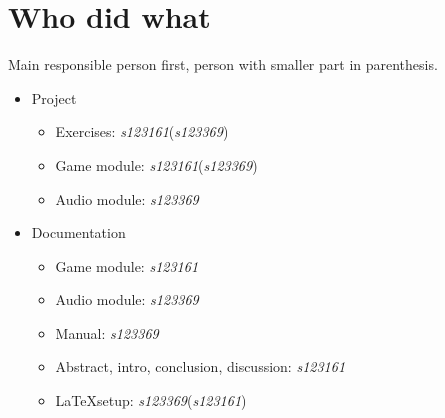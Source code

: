 \section{Who did what}
Main responsible person first, person with smaller part in parenthesis.

\newcommand{\cars}{\emph{s123161}}
\newcommand{\sor}{\emph{s123369}}
\begin{itemize}
  \item Project
  \begin{itemize}
    \item Exercises:  \cars  (\sor)
    \item Game module:  \cars (\sor)
    \item Audio module: \sor
  \end{itemize} 
  \item Documentation
  \begin{itemize}
    \item Game module:  \cars
    \item Audio module:  \sor
    \item Manual:  \sor
    \item Abstract, intro, conclusion, discussion:  \cars
    \item \LaTeX setup:  \sor  (\cars)
  \end{itemize} 
\end{itemize}
